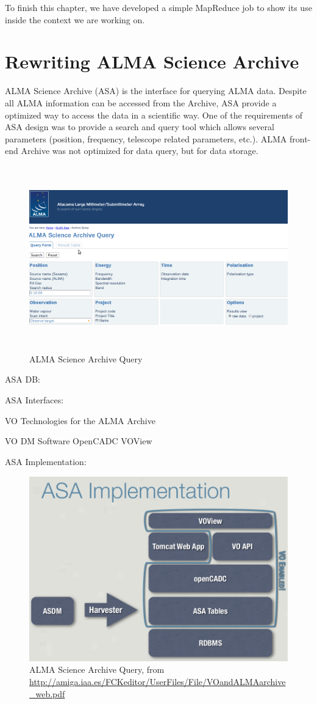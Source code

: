 \newpage

To finish this chapter, we have developed a simple MapReduce job to show its use inside the context we are working on.




\section{Rewriting ALMA Science Archive}

ALMA Science Archive (ASA) is the interface for querying ALMA data. Despite all ALMA information can be accessed from the Archive, ASA provide a optimized way to access the data in a scientific way. One of the requirements of ASA design was to provide a search and query tool which allows several parameters (position, frequency, telescope related parameters, etc.). ALMA front-end Archive was not optimized for data query, but for data storage. \newline


\begin{figure}
\centering
\includegraphics[width=14cm,height=8cm]{images/aq.png}
\caption{ALMA Science Archive Query}
\end{figure}


ASA DB:

ASA Interfaces:


VO Technologies for the ALMA Archive

VO DM
Software
  OpenCADC
  VOView

ASA Implementation:

\begin{figure}
\centering
\includegraphics[width=14cm,height=8cm]{images/asa_implementation.png}
\caption{ALMA Science Archive Query, from  \url{http://amiga.iaa.es/FCKeditor/UserFiles/File/VOandALMAarchive_web.pdf‎}}
\end{figure}